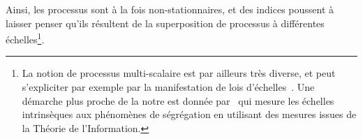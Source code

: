 

Ainsi, les processus sont à la fois non-stationnaires, et des indices poussent à laisser penser qu'ils résultent de la superposition de processus à différentes échelles\footnote{La notion de processus multi-scalaire est par ailleurs très diverse, et peut s'expliciter par exemple par la manifestation de lois d'échelles~\cite{west2017scale}. Une démarche plus proche de la notre est donnée par~\cite{Chodrow31102017} qui mesure les échelles intrinsèques aux phénomènes de ségrégation en utilisant des mesures issues de la Théorie de l'Information.}.



